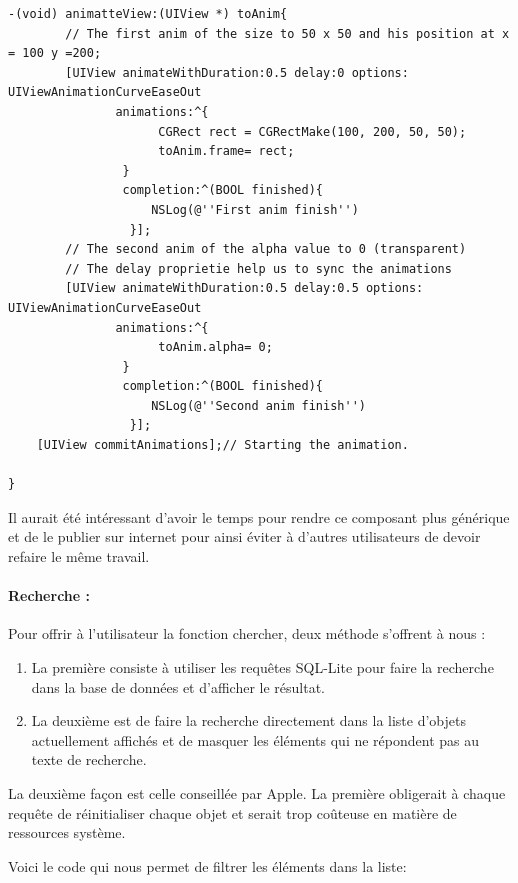 \begin{lstlisting}[name=Animation UIView  , label=animateWithDuration]
-(void) animatteView:(UIView *) toAnim{
		// The first anim of the size to 50 x 50 and his position at x = 100 y =200;
        [UIView animateWithDuration:0.5 delay:0 options: UIViewAnimationCurveEaseOut
               animations:^{
                     CGRect rect = CGRectMake(100, 200, 50, 50);
                     toAnim.frame= rect;
                } 
                completion:^(BOOL finished){
					NSLog(@''First anim finish'')
                 }];
		// The second anim of the alpha value to 0 (transparent)
		// The delay proprietie help us to sync the animations
        [UIView animateWithDuration:0.5 delay:0.5 options: UIViewAnimationCurveEaseOut
               animations:^{
                     toAnim.alpha= 0;
                } 
                completion:^(BOOL finished){
					NSLog(@''Second anim finish'')
                 }];
    [UIView commitAnimations];// Starting the animation.

}
\end{lstlisting}

					Il aurait été intéressant d'avoir le temps pour rendre ce composant plus générique et de le publier sur internet pour ainsi éviter à d'autres utilisateurs de devoir refaire le même travail.
					
					\paragraph{Recherche :}Pour offrir à l'utilisateur la fonction chercher, deux méthode s'offrent à nous :
					\begin{enumerate}
					\item La première consiste à utiliser les requêtes SQL-Lite pour faire la recherche dans la base de données et d'afficher le résultat.
					\item La deuxième est de faire la recherche directement dans la liste d'objets actuellement affichés et de masquer les éléments qui ne répondent pas au texte de recherche.
					\end{enumerate} 
					La deuxième façon est celle conseillée par Apple. La première obligerait à chaque requête de réinitialiser chaque objet et serait trop coûteuse en matière de ressources système. 
					
					Voici le code qui nous permet de filtrer les éléments dans la liste:
	\lstset{
			    style = Xcode,
			    caption=Methode de recherche dans une UITableView.,
			    breaklines=true,
			    frame=single
			}

